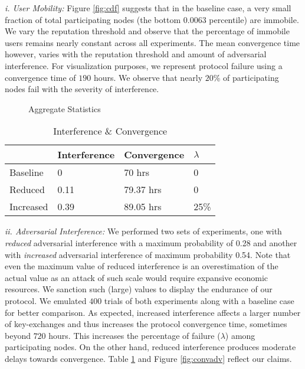 \documentclass[letterpaper,twocolumn]{sig-alternate}
\begin{document}
\vspace{1mm}
{\em i. User Mobility:} Figure \ref{fig:cdf} suggests that in the baseline case, a very small fraction of total participating nodes (the bottom 0.0063 percentile) are immobile. We vary the reputation threshold and observe that the percentage of immobile users remains nearly constant across all experiments. The mean convergence time however, varies with the reputation threshold and amount of adversarial interference. For visualization purposes, we represent protocol failure using a convergence time of $190$ hours. We observe that nearly $20$\% of participating nodes fail with the severity of interference.

\begin{figure*}
\centering
{}

\caption{Aggregate Statistics}
\end{figure*}

\begin{table}[h]
\centering
\begin{tabular}{| l | l | l | l |}
\hline 
\textbf{} & \small{\textbf{Interference}} & \small{\textbf{Convergence}} & \small{\textbf{$\lambda$}}\\ 
\hline
 Baseline & 0 & 70 hrs & 0\\ 
 \hline
 Reduced & 0.11 & 79.37 hrs & 0\\ 
 \hline
 Increased & 0.39 & 89.05 hrs & 25\%\\ 
 \hline
\end{tabular}
\caption {Interference \& Convergence}
\label{table:adv}
\end{table}


\vspace{1mm}
{\em ii. Adversarial Interference:} We performed two sets of experiments, one with {\em reduced} adversarial interference with a maximum probability of 0.28 and another with {\em increased} adversarial interference of maximum probability 0.54. Note that even the maximum value of reduced interference is an overestimation of the actual value as an attack of such scale would require expansive economic resources. We sanction such (large) values to display the endurance of our protocol. We emulated $400$ trials of both experiments along with a baseline case for better comparison. As expected, increased interference affects a larger number of key-exchanges and thus increases the protocol convergence time, sometimes beyond $720$ hours. This increases the percentage of failure ($\lambda$) among participating nodes. On the other hand, reduced interference produces moderate delays towards convergence. Table \ref{table:adv} and Figure \ref{fig:convadv} reflect our claims.  
\end{document}
